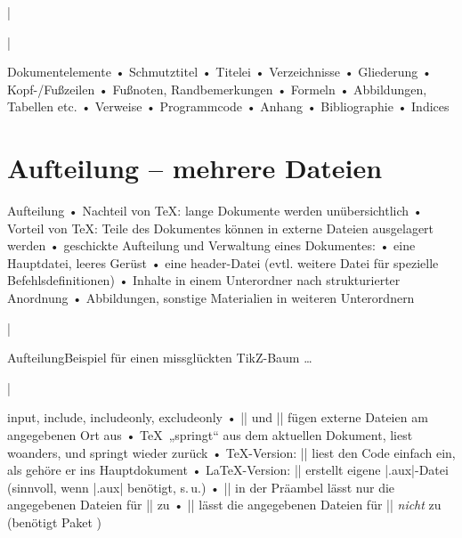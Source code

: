 

\DeleteShortVerb|

\usepackage{
tikz
}
\usetikzlibrary{trees}
\MakeShortVerb|



\begin{frame}{Dokumentelemente}
• Schmutztitel
• Titelei
• Verzeichnisse
• Gliederung
• Kopf-/Fußzeilen
• Fußnoten, Randbemerkungen
• Formeln
• Abbildungen, Tabellen etc.
• Verweise
• Programmcode
• Anhang
• Bibliographie
• Indices
\•
\end{frame}

\section{Aufteilung – mehrere Dateien}
\begin{frame}{Aufteilung}
• Nachteil von \TeX: lange Dokumente werden unübersichtlich\pause
• Vorteil von \TeX: Teile des Dokumentes können in externe Dateien ausgelagert werden
• geschickte Aufteilung und Verwaltung eines Dokumentes:
• eine Hauptdatei, leeres Gerüst
• eine header-Datei (evtl. weitere Datei für spezielle Befehlsdefinitionen)
• Inhalte in einem Unterordner nach strukturierter Anordnung
• Abbildungen, sonstige Materialien in weiteren Unterordnern
\•
\end{frame}

\DeleteShortVerb|

\begin{frame}{Aufteilung}{Beispiel für einen missglückten TikZ-Baum …}
\end{frame}

\MakeShortVerb|
\begin{frame}[fragile]{input, include, includeonly, excludeonly}
• || und || fügen externe Dateien am angegebenen Ort aus
• \TeX\ „springt“ aus dem aktuellen Dokument, liest woanders, und springt wieder zurück \pause
• \TeX-Version: || liest den Code einfach ein, als gehöre er ins Hauptdokument
• \LaTeX-Version: || erstellt eigene |.aux|-Datei (sinnvoll, wenn |.aux| benötigt, s.\,u.)
• || in der Präambel lässt nur die angegebenen Dateien für || zu
• || lässt die angegebenen Dateien für || \emph{nicht} zu (benötigt Paket )
\•
\end{frame}

